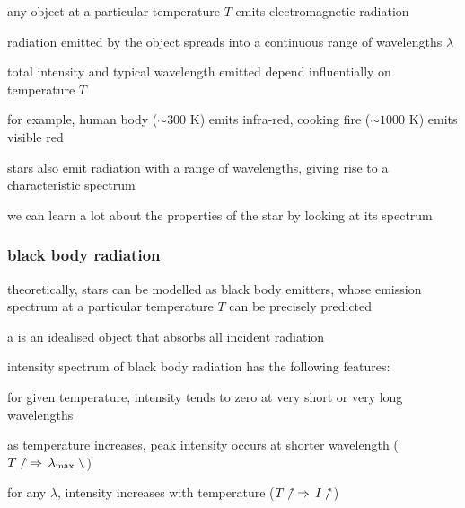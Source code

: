 any object at a particular temperature $T$ emits electromagnetic radiation

radiation emitted by the object spreads into a continuous range of wavelengths $\lambda$

total intensity and typical wavelength emitted depend influentially on temperature $T$

for example, human body ($\sim 300 \text{ K}$) emits infra-red, cooking fire ($\sim 1000 \text{ K}$) emits visible red

stars also emit radiation with a range of wavelengths, giving rise to a characteristic spectrum

we can learn a lot about the properties of the star by looking at its spectrum

\subsubsection{black body radiation}

theoretically, stars can be modelled as black body emitters, whose emission spectrum at a particular temperature $T$ can be precisely predicted

\begin{ilight}
	a  is an idealised object that absorbs all incident radiation
\end{ilight}

\cmt intensity spectrum of black body radiation has the following features:

\titem for given temperature, intensity tends to zero at very short or very long wavelengths

\titem as temperature increases, peak intensity occurs at shorter wavelength ($T\nnearrow \, \Rightarrow \, \lambda_\text{max}\ssearrow$)

\titem for any $\lambda$, intensity increases with temperature ($T\nnearrow \, \Rightarrow \, I\nnearrow$)


